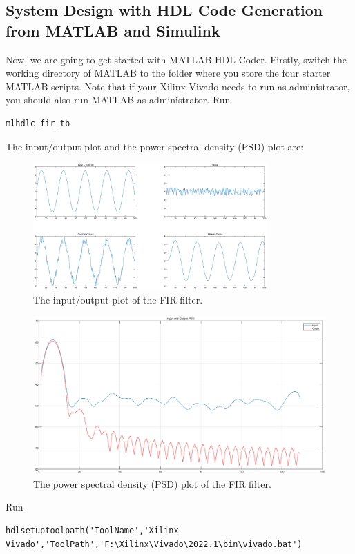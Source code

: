 \documentclass[a4paper,12pt,twoside]{article}
\begin{document}
\subsection{System Design with HDL Code Generation from MATLAB and Simulink}
Now, we are going to get started with MATLAB HDL Coder. Firstly, switch the working directory of MATLAB to the folder where you store the four starter MATLAB scripts. Note that if your Xilinx Vivado needs to run as administrator, you should also run MATLAB as administrator. Run
\begin{verbatim}
mlhdlc_fir_tb
\end{verbatim}
The input/output plot and the power spectral density (PSD) plot are:
\begin{figure}[H]
    \centering
    \includegraphics[width=0.8\textwidth]{images/mlhdlc_fir_tb_io_plot.eps}
    \caption{The input/output plot of the FIR filter.}
\end{figure}
\begin{figure}[H]
    \centering
    \includegraphics[width=\textwidth]{images/mlhdlc_fir_tb_psd_plot.eps}
    \caption{The power spectral density (PSD) plot of the FIR filter.}
\end{figure}
Run
\begin{verbatim}
hdlsetuptoolpath('ToolName','Xilinx Vivado','ToolPath','F:\Xilinx\Vivado\2022.1\bin\vivado.bat')
\end{verbatim}
\end{document}
